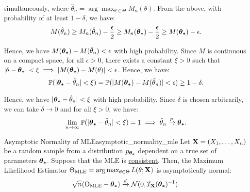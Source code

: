 \begin{proof*}
    \noindent simultaneously, where $\hat\theta_n = \arg\max_{\theta\in\Theta}M_n(\theta)$. From the above, with probability of at least $1-\delta$, we have:
    \begin{align*}
        M(\hat\theta_n) \ge M_n(\hat\theta_n) - \frac{\epsilon}{2} \ge M_n(\boldsymbol{\theta_*}) - \frac{\epsilon}{2} \ge M(\boldsymbol{\theta_*}) - \epsilon.
    \end{align*} 

    \noindent Hence, we have $M(\boldsymbol{\theta_*}) - M(\hat\theta_n) < \epsilon$ with high probability. Since $M$ is continuous on a compact space, for all $\epsilon>0$, there exists a constant $\xi>0$ such that $|\theta - \boldsymbol{\theta_*}| < \xi \implies |M(\boldsymbol{\theta_*}) - M(\theta)|<\epsilon$. Hence, we have:
    \begin{align*}
        \mathbb{P}(|\boldsymbol{\theta_*} - \hat\theta_n| < \xi) = \mathbb{P}(|M(\boldsymbol{\theta_*})-M(\hat\theta_n)| < \epsilon) \ge 1 - \delta.  
    \end{align*}   

    \noindent Hence, we have $|\boldsymbol{\theta_*}-\hat\theta_n|<\xi$ with high probability. Since $\delta$ is chosen arbitrarily, we can take $\delta\to0$ and for all $\xi>0$, we have: 
    \begin{align*}
        \lim_{n\to\infty}\mathbb{P}(|\boldsymbol{\theta_*}-\hat\theta_n|<\xi) = 1 \implies \hat\theta_n \xrightarrow{p} \boldsymbol{\theta_*}. 
    \end{align*} 
\end{proof*} 

\begin{proposition}{Asymptotic Normality of MLE}{asymptotic_normality_mle}
    Let ${\bf X}=(X_1, \dots, X_n)$ be a random sample from a distribution $p_{\boldsymbol{\theta_*}}$ dependent on a true set of parameters $\boldsymbol{\theta_*}$. Suppose that the $\mathrm{MLE}$ is \underline{consistent}. Then, the Maximum Likelihood Estimator $\Theta_\mathrm{MLE} = \arg\max_{\theta\in\Theta}L(\theta;{\bf X})$ is asymptotically normal:
    \begin{equation}
        \sqrt{n}(\Theta_\mathrm{MLE} - \boldsymbol{\theta_*}) \xrightarrow{d} \mathcal{N}(0, \mathcal{I}_{{\bf X}}(\boldsymbol{\theta_*})^{-1}).
    \end{equation}
\end{proposition} 

